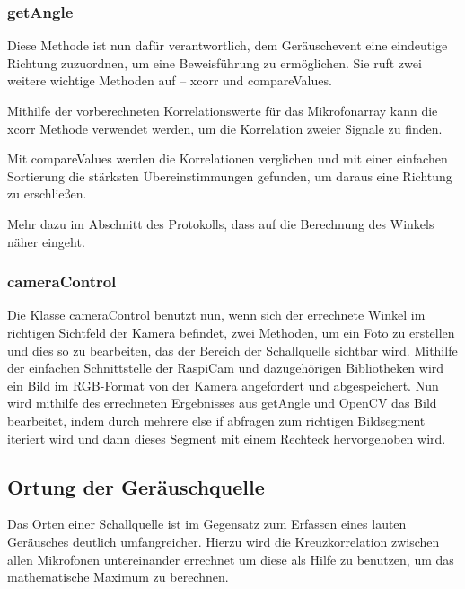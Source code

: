 %

\subsubsection{getAngle}

Diese Methode ist nun dafür verantwortlich, dem Geräuschevent eine eindeutige Richtung zuzuordnen, um eine Beweisführung zu ermöglichen. Sie ruft zwei weitere wichtige Methoden auf – xcorr und compareValues.

Mithilfe der vorberechneten Korrelationswerte für das Mikrofonarray kann die xcorr Methode verwendet werden, um die Korrelation zweier Signale zu finden.

Mit compareValues werden die Korrelationen verglichen und mit einer einfachen Sortierung die stärksten Übereinstimmungen gefunden, um daraus eine Richtung zu erschließen.

Mehr dazu im Abschnitt des Protokolls, dass auf die Berechnung des Winkels näher eingeht.

\subsubsection{cameraControl}

Die Klasse cameraControl benutzt nun, wenn sich der errechnete Winkel im richtigen Sichtfeld der Kamera befindet, zwei Methoden, um ein Foto zu erstellen und dies so zu bearbeiten, das der Bereich der Schallquelle sichtbar wird. Mithilfe der einfachen Schnittstelle der RaspiCam und dazugehörigen Bibliotheken wird ein Bild im RGB-Format von der Kamera angefordert und abgespeichert. Nun wird mithilfe des errechneten Ergebnisses aus getAngle und OpenCV das Bild bearbeitet, indem durch mehrere else if abfragen zum richtigen Bildsegment iteriert wird und dann dieses Segment mit einem Rechteck hervorgehoben wird.


\subsection{Ortung der Geräuschquelle}

Das Orten einer Schallquelle ist im Gegensatz zum Erfassen eines lauten Geräusches deutlich umfangreicher. Hierzu wird die Kreuzkorrelation zwischen allen Mikrofonen untereinander errechnet um diese als Hilfe zu benutzen, um das mathematische Maximum zu berechnen.

